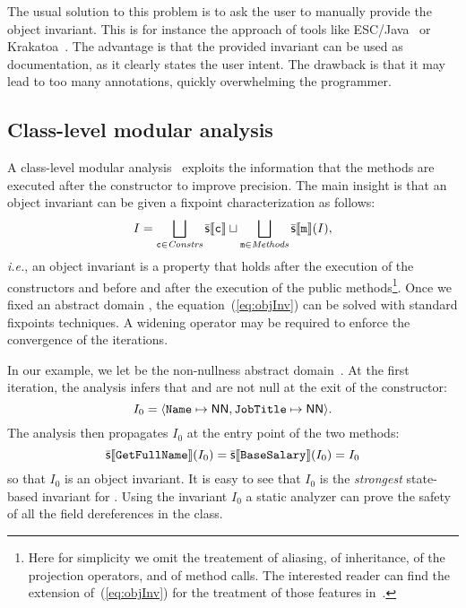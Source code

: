 \documentclass{llncs}
\newcommand{\refEq}[1]{(\ref{eq:#1})}
\begin{document}
The usual solution to this problem is to ask the user to manually provide the object invariant.
This is for instance the approach of tools like ESC/Java~\cite{ESCJava,ChalinEtAl-FMCO05} or Krakatoa~\cite{FilliatreMarche:CAV07}.
The advantage is that the provided invariant can be used as documentation, as it clearly states the user intent.
The drawback is that it may lead to too many annotations, quickly overwhelming the programmer.

\subsection{Class-level modular analysis}
\label{sec:overappr}

A class-level modular analysis~\cite{Logozzo03} exploits the information that the methods are executed after the constructor to improve precision.
The main insight is that an object invariant can be given a fixpoint characterization as follows:
\begin{equation}
I = \bigsqcup_{\mathtt{c} \in \mathit{Constrs}}\mathbb{\bar{\mathsf{s}}}\llbracket \mathtt{c} \rrbracket  \sqcup \bigsqcup_{\mathtt{m} \in \mathit{Methods}}  \mathbb{\bar{\mathsf{s}}}\llbracket \mathtt{m} \rrbracket(I),
\label{eq:objInv}
\end{equation}
\emph{i.e.}, an object invariant is a property that holds after the execution of the constructors and before and after the execution of the public methods\footnote{Here for simplicity we omit the treatement of aliasing, of inheritance, of the projection operators, and of method calls. The interested reader can find the extension of~\refEq{objInv} for the  treatment of those features in~\cite{LogozzoPhD04}.}.
Once we fixed an abstract domain , the equation~\refEq{objInv} can be solved with standard fixpoints techniques.
A widening operator may be required to enforce the convergence of the iterations.

In our example, we let  be the non-nullness abstract domain~\cite{FahndrichLeino03}.
At the first iteration, the analysis  infers that  and  are not null at the exit of the constructor:
\[
I_0 = \langle \mathtt{Name} \mapsto \mathsf{NN}, \mathtt{JobTitle} \mapsto \mathsf{NN} \rangle.
\] 
The analysis then propagates  $I_0$ at the entry point of the two methods:
\[
\mathbb{\bar{\mathsf{s}}}\llbracket \mathtt{GetFullName} \rrbracket(I_0) = \mathbb{\bar{\mathsf{s}}}\llbracket \mathtt{BaseSalary} \rrbracket(I_0) = I_0
\]
so that $I_0$ is an object invariant.
It is easy to see that $I_0$ is the \emph{strongest} state-based invariant for .
Using the invariant $I_0$ a static analyzer can prove the safety of all the field dereferences in the class.
\end{document}
